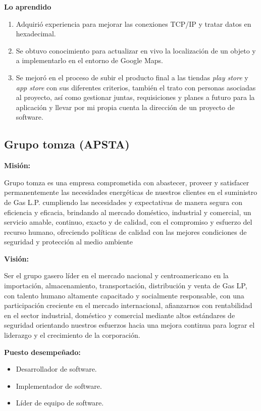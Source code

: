 \documentclass[protocolo.tex]{subfiles}
\begin{document}
\textbf{Lo aprendido}
\begin{enumerate}
\item Adquirió experiencia para mejorar las conexiones TCP/IP y tratar datos en hexadecimal.

\item Se obtuvo conocimiento para actualizar en vivo la localización de un objeto y a implementarlo en el
entorno de Google Maps.

\item Se mejoró en el proceso de subir el producto final a las tiendas \textit{play store} y \textit{app store} con
sus diferentes criterios, también el trato con personas asociadas al proyecto, así como
gestionar juntas, requisiciones y planes a futuro para la aplicación y llevar por mi propia
cuenta la dirección de un proyecto de software.

\end{enumerate}
\vfill %
\subsection{Grupo tomza (APSTA)}

\textbf{Misión:}

Grupo tomza es una empresa comprometida con abastecer, proveer y satisfacer permanentemente las necesidades energéticas de nuestros clientes en el suministro de Gas L.P. cumpliendo las necesidades y expectativas de manera segura con eficiencia y eficacia, brindando al mercado doméstico, industrial y comercial, un servicio amable, continuo, exacto y de calidad, con el compromiso y esfuerzo del recurso humano, ofreciendo políticas de calidad con las mejores condiciones de seguridad y protección al medio ambiente

\textbf{Visión:} 

Ser el grupo gasero líder en el mercado nacional y centroamericano en la importación, almacenamiento, transportación, distribución y venta de Gas LP, con talento humano altamente capacitado y socialmente responsable, con una participación creciente en el mercado internacional, afianzarnos con rentabilidad en el sector industrial, doméstico y comercial mediante altos estándares de seguridad orientando nuestros esfuerzos hacia una mejora continua para lograr el liderazgo y el crecimiento de la corporación.

\textbf{Puesto desempeñado:} 
\begin{itemize}
\item Desarrollador de software.
\item Implementador de software.
\item Líder de equipo de software.

\end{itemize}
\end{document}
